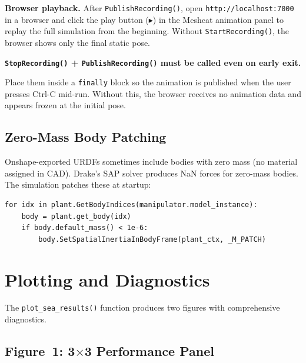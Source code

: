 \documentclass[11pt,a4paper]{article}
\begin{document}
\begin{resultbox}
\textbf{Browser playback.}
After \texttt{PublishRecording()}, open \texttt{http://localhost:7000} in a
browser and click the play button (\textbf{$\blacktriangleright$}) in the Meshcat animation panel to
replay the full simulation from the beginning.
Without \texttt{StartRecording()}, the browser shows only the final static pose.
\end{resultbox}

\begin{warnbox}
\textbf{\texttt{StopRecording()} + \texttt{PublishRecording()} must be called even on early exit.}

Place them inside a \texttt{finally} block so the animation is published when
the user presses Ctrl-C mid-run.  Without this, the browser receives no
animation data and appears frozen at the initial pose.
\end{warnbox}


\subsection{Zero-Mass Body Patching}

\begin{warnbox}
Onshape-exported URDFs sometimes include bodies with zero mass (no material assigned in CAD).  Drake's SAP solver produces NaN forces for zero-mass bodies.  The simulation patches these at startup:

\begin{lstlisting}[caption={Zero-mass body patching.}]
for idx in plant.GetBodyIndices(manipulator.model_instance):
    body = plant.get_body(idx)
    if body.default_mass() < 1e-6:
        body.SetSpatialInertiaInBodyFrame(plant_ctx, _M_PATCH)
\end{lstlisting}
\end{warnbox}


\section{Plotting and Diagnostics}
\label{sec:plotting}

The \texttt{plot\_sea\_results()} function produces two figures with comprehensive diagnostics.

\subsection{Figure~1: 3$\times$3 Performance Panel}
\end{document}
